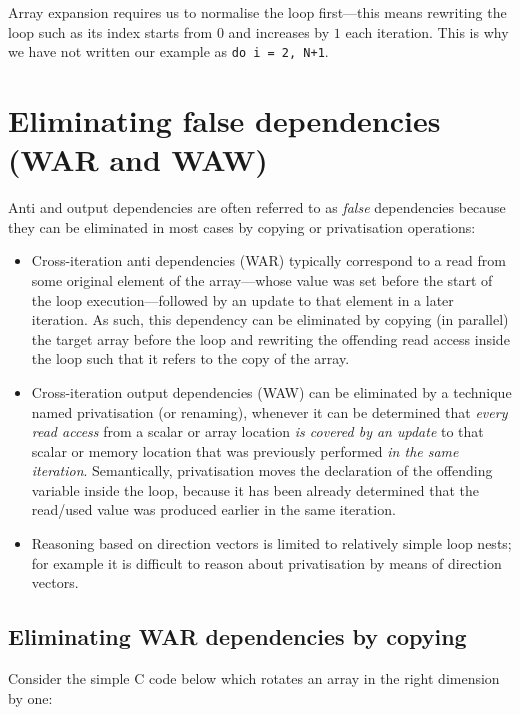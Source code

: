 Array expansion requires us to normalise the loop first---this means
rewriting the loop such as its index starts from $0$ and increases by
$1$ each iteration. This is why we have not written our example as
\lstinline{do i = 2, N+1}.

\section{Eliminating false dependencies (WAR and WAW)}
\label{sec:false-dep-elim}

Anti and output dependencies are often referred to as \emph{false}
dependencies because they can be eliminated in most cases by copying
or privatisation operations:
\begin{itemize}
\item Cross-iteration anti dependencies (WAR) typically
  correspond to a read from some original element of
  the array---whose value was set before the start of
  the loop execution---followed by an update to that
  element in a later iteration.  As such, this dependency
  can be eliminated by copying (in parallel) the target
  array before the loop and rewriting the offending
  read access inside the loop such that it refers
  to the copy of the array.

\item Cross-iteration output dependencies (WAW) can be
  eliminated by a technique named privatisation (or renaming),
  whenever it can be determined that {\em every read access}
  from a scalar or array location {\em is covered by an
    update} to that scalar or memory location that was
  previously performed {\em in the same iteration}.
  Semantically, privatisation moves the declaration of the
  offending variable inside the loop, because it has been
  already determined that the read/used value was produced
  earlier in the same iteration.

\item Reasoning based on direction vectors is limited to
  relatively simple loop nests; for example it is difficult
  to reason about privatisation by means of direction vectors.
\end  {itemize}

\subsection{Eliminating WAR dependencies by copying}

Consider the simple C code below which rotates an array in the right
dimension by one:


